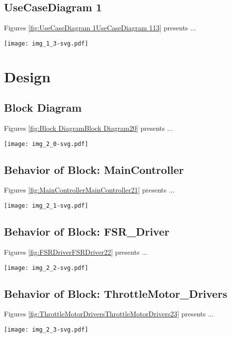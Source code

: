 \subsection{UseCaseDiagram 1}
Figures \ref{fig:UseCaseDiagram 1UseCaseDiagram 113} presents ...
\begin{figure*}[htb]
\centering
\texttt{[image: img\_1\_3-svg.pdf]}
\caption{Diagram "UseCaseDiagram 1"}
\label{fig:UseCaseDiagram 1UseCaseDiagram 113}
\end{figure*}

\section{Design}
\subsection{Block Diagram}
Figures \ref{fig:Block DiagramBlock Diagram20} presents ...
\begin{figure*}[htb]
\centering
\texttt{[image: img\_2\_0-svg.pdf]}
\caption{Diagram "Block Diagram"}
\label{fig:Block DiagramBlock Diagram20}
\end{figure*}

\subsection{Behavior of Block: MainController}
Figures \ref{fig:MainControllerMainController21} presents ...
\begin{figure*}[htb]
\centering
\texttt{[image: img\_2\_1-svg.pdf]}
\caption{Diagram "Behavior of Block: MainController"}
\label{fig:MainControllerMainController21}
\end{figure*}

\subsection{Behavior of Block: FSR\_Driver}
Figures \ref{fig:FSRDriverFSRDriver22} presents ...
\begin{figure*}[htb]
\centering
\texttt{[image: img\_2\_2-svg.pdf]}
\caption{Diagram "Behavior of Block: FSR\_Driver"}
\label{fig:FSRDriverFSRDriver22}
\end{figure*}

\subsection{Behavior of Block: ThrottleMotor\_Drivers}
Figures \ref{fig:ThrottleMotorDriversThrottleMotorDrivers23} presents ...
\begin{figure*}[htb]
\centering
\texttt{[image: img\_2\_3-svg.pdf]}
\caption{Diagram "Behavior of Block: ThrottleMotor\_Drivers"}
\label{fig:ThrottleMotorDriversThrottleMotorDrivers23}
\end{figure*}

